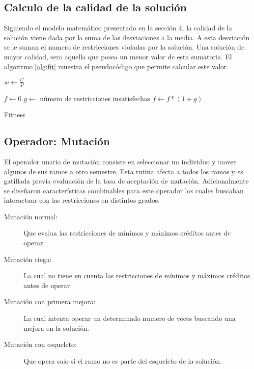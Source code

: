 \documentclass[letter, 10pt]{article}
\begin{document}
\subsection{Calculo de la calidad de la solución}
Siguiendo el modelo matemático presentado en la sección 4, la calidad de la solución viene dada por la suma de las desviaciones a la media.
A esta desviación se le suman el numero de restricciones violadas por la solución. Una solución de mayor calidad, sera aquella que posea
un menor valor de esta sumatoria. El algoritmo \ref{alg:fit} muestra el pseudocódigo que permite calcular este valor.

\begin{algorithm}[H]
\SetLine
{}
$w \gets \frac{C}{P}$

$f \gets 0$ \;
$g \gets$ número de restricciones insatisfechas \;
$f \gets f * (1+g)$ \;


\caption{Fitness}
\label{alg:fit}
\end{algorithm}




\subsection{Operador: Mutación}
El operador unario de mutación consiste en seleccionar un individuo y mover algunos de sus ramos a otro semestre.
Esta rutina afecta a todos los ramos y es gatillada previa evaluación de la tasa de aceptación de mutación.
Adicionalmente se diseñaron características combinables para este operador los cuales buscaban interactuar con las restricciones en distintos grados:

\begin{description}
	\item[Mutación normal:] Que evalua las restricciones de mínimos y máximos créditos antes de operar.
	\item[Mutación ciega: ] La cual no tiene en cuenta las restricciones de mínimos y máximos créditos antes de operar
	\item[Mutación con primera mejora:] La cual intenta operar un determinado numero de veces buscando una mejora en la solución.
	\item[Mutación con esqueleto:] Que opera solo si el ramo no es parte del esqueleto de la solución.
\end{description}
\end{document}
